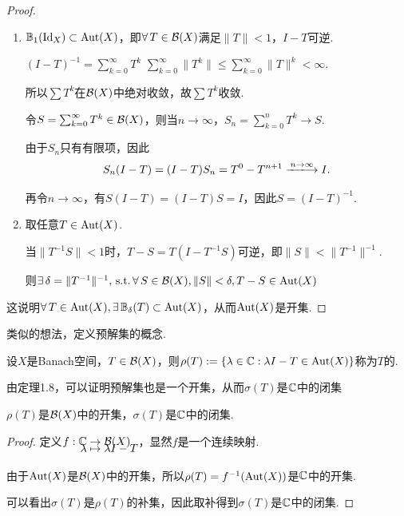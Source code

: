\begin{proof}
    \begin{enumerate}[label=Step \arabic*.,leftmargin=4em]
        \item $\mathbb{B}_1(\mathrm{Id}_X)\subset \operatorname{Aut}(X)$，即$\forall\, T\in\mathcal{B}(X)$满足$\|T\|< 1$，$I-T$可逆.\par
        \begin{claim}{$(I-T)^{-1}=\sum_{k=0}^{\infty}T^k$}
            $\sum_{k=0}^\infty\|T^k\|\leq \sum_{k=0}^\infty \|T\|^k<\infty$.\par
            所以$\sum T^k$在$\mathcal{B}(X)$中绝对收敛，故$\sum T^k$收敛.\par
            令$S=\sum_{k=0}^\infty T^k\in\mathcal{B}(X)$，则当$n\to\infty$，$S_n=\sum_{k=0}^nT^k\to S$.\par
            由于$S_n$只有有限项，因此
            \begin{equation*}
            S_n(I-T)=(I-T)S_n=T^0-T^{n+1}\xlongrightarrow{n\to\infty}I.
            \end{equation*}\par
            再令$n\to\infty$，有$S(I-T)=(I-T)S=I$，因此$S=(I-T)^{-1}$.
        \end{claim}
        \item 取任意$T\in\operatorname{Aut}(X)$.\par
        当$\|T^{-1}S\|<1$时，$T-S=T(I-T^{-1}S)$可逆，即$\|S\|<\|T^{-1}\|^{-1}$.\par
        则$\exists\, \delta=\|T^{-1}\|^{-1},\operatorname{\,\text{s.t.}}\forall\, S\in\mathcal{B}(X),\|S\|<\delta,T-S\in \operatorname{Aut}(X)$
    \end{enumerate}\par
    这说明$\forall\, T\in\operatorname{Aut}(X),\exists\,\mathbb{B}_\delta(T)\subset \operatorname{Aut}(X)$，从而$\operatorname{Aut}(X)$是开集.
\end{proof}
类似的想法，定义预解集的概念.
\begin{definition}[预解集]
    设$X$是Banach空间，$T\in\mathcal{B}(X)$，则$\rho(T):=\{\lambda\in\mathbb{C}:\lambda I-T\in\operatorname{Aut}(X)\}$称为$T$的.
\end{definition}
由定理1.8，可以证明预解集也是一个开集，从而$\sigma(T)$是$\mathbb{C}$中的闭集\par
\begin{corollary}[]
    $\rho(T)$是$\mathcal{B}(X)$中的开集，$\sigma(T)$是$\mathbb{C}$中的闭集.
\end{corollary}
\begin{proof}
    定义$\setjot[-6]\begin{aligned}[t]
        f:\mb{C} &\to \mcal{B}(X) \\
        \lambda &\mapsto \lambda I-T
    \end{aligned}$，显然$f$是一个连续映射.\par
    由于$\operatorname{Aut}(X)$是$\mathcal{B}(X)$中的开集，所以$\rho(T)=f^{-1}(\operatorname{Aut}(X))$是$\mathbb{C}$中的开集.\par
    可以看出$\sigma(T)$是$\rho(T)$的补集，因此取补得到$\sigma(T)$是$\mathbb{C}$中的闭集.
\end{proof}

